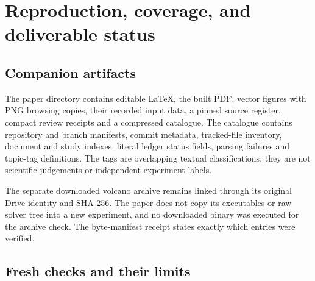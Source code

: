 \section{Reproduction, coverage, and deliverable status}\label{app:reproduction}

\subsection{Companion artifacts}

The paper directory contains editable LaTeX, the built PDF, vector
figures with PNG browsing copies, their recorded input data, a pinned
source register, compact review receipts and a compressed catalogue.
The catalogue contains repository and branch manifests, commit
metadata, tracked-file inventory, document and study indexes, literal
ledger status fields, parsing failures and topic-tag definitions.
The tags are overlapping textual classifications; they are not
scientific judgements or independent experiment labels.

The separate downloaded volcano archive remains linked through its
original Drive identity and SHA-256. The paper does not copy its
executables or raw solver tree into a new experiment, and no downloaded
binary was executed for the archive check. The byte-manifest receipt
states exactly which entries were verified.

\subsection{Fresh checks and their limits}

